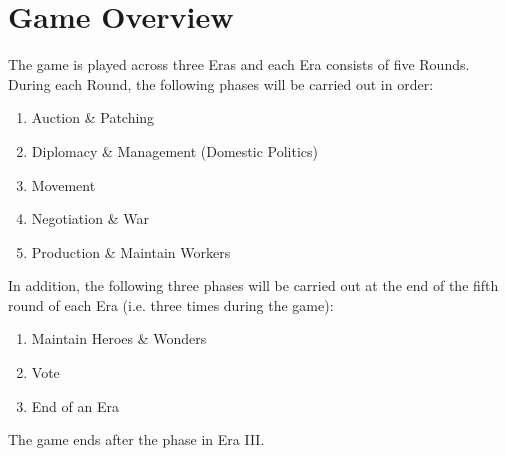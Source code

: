 \documentclass[10pt,twocolumn]{article}
\begin{document}
\section{Game Overview}
The game is played across three Eras and each Era consists of five Rounds. During each Round, the following phases will be carried out in order:
\begin{enumerate}
\item Auction \& Patching \landcards
\item Diplomacy \& Management (Domestic Politics)
\item Movement
\item Negotiation \& War
\item Production \& Maintain Workers
\end{enumerate}
In addition, the following three phases will be carried out at the end of the fifth round of each Era (i.e. three times during the game):
\begin{enumerate}[resume]
\item Maintain Heroes \& Wonders
\item Vote
\item End of an Era
\end{enumerate}

The game ends after the  phase in Era III.
\end{document}
